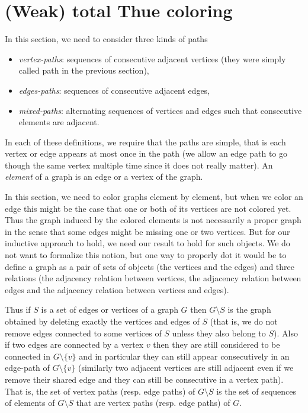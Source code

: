 \documentclass[a4paper,10pt]{article}
\begin{document}
 
 
\section{(Weak) total Thue coloring}
In this section, we need to consider three kinds of paths
\begin{itemize}
 \item \emph{vertex-paths}: sequences of consecutive adjacent vertices (they were simply called path in the previous section),
 \item \emph{edges-paths}: sequences of consecutive adjacent edges,
 \item \emph{mixed-paths}: alternating sequences of vertices and edges such that consecutive elements are adjacent.
\end{itemize}
In each of these definitions, we require that the paths are simple, that is each vertex or edge appears at most once in the path (we allow an edge path to go though the same vertex multiple time since it does not really matter). An \emph{element} of a graph is an edge or a vertex of the graph.

In this section, we need to color graphs element by element, but when we color an edge this might be the case that one or both of its vertices are not colored yet.
Thus the graph induced by the colored elements is not necessarily a proper graph in the sense that
some edges might be missing one or two vertices.
But for our inductive approach to hold, we need our result to hold for such objects.
We do not want to formalize this notion, but one way to properly dot it would be to define a graph as a pair of sets of objects (the vertices and the edges) and three relations (the adjacency relation between vertices, the adjacency relation between edges and the adjacency relation between vertices and edges).

Thus if $S$ is a set of edges or vertices of a graph $G$
then $G\setminus S$ is the graph obtained by deleting exactly the vertices and edges of $S$ (that is, we do not remove edges connected to some vertices of $S$ unless they also belong to $S$). 
Also if two edges are connected by a vertex $v$ then they are still considered to be connected in $G\setminus \{v\}$ and in particular they can still appear consecutively in an edge-path  of $G\setminus \{v\}$ (similarly two adjacent vertices are still adjacent even if we remove their shared edge and they can still be consecutive in a vertex path).
That is, the set of vertex paths (resp. edge paths) of $G\setminus S$
is the set of sequences of elements of $G\setminus S$ that are
vertex paths (resp. edge paths) of $G$.
\end{document}
